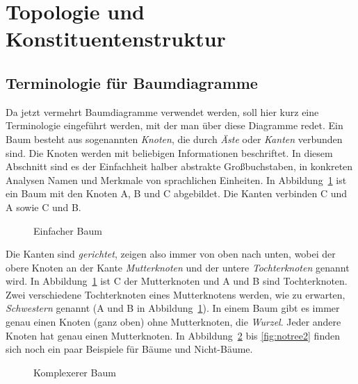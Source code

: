 \section{Topologie und Konstituentenstruktur}

\label{sec:topokons}

\subsection{Terminologie für Baumdiagramme}

\label{sec:baumterminologie}


Da jetzt vermehrt Baumdiagramme verwendet werden, soll hier kurz eine Terminologie eingeführt werden, mit der man über diese Diagramme redet.
Ein Baum besteht aus sogenannten \textit{Knoten}, die durch \textit{Äste} oder \textit{Kanten} verbunden sind.
Die Knoten werden mit beliebigen Informationen beschriftet.
In diesem Abschnitt sind es der Einfachheit halber abstrakte Großbuchstaben, in konkreten Analysen Namen und Merkmale von sprachlichen Einheiten.
In Abbildung~\ref{fig:baumschema} ist ein Baum mit den Knoten A, B und C abgebildet.
Die Kanten verbinden C und A sowie C und B.


\begin{figure}[!htbp]
  \centering
  \caption{Einfacher Baum}
  \label{fig:baumschema}
\end{figure}


Die Kanten sind \textit{gerichtet}, zeigen also immer von oben nach unten, wobei der obere Knoten an der Kante \textit{Mutterknoten} und der untere \textit{Tochterknoten} genannt wird.
In Abbildung~\ref{fig:baumschema} ist C der Mutterknoten und A und B sind Tochterknoten.
Zwei verschiedene Tochterknoten eines Mutterknotens werden, wie zu erwarten, \textit{Schwestern} genannt (\zB A und B in Abbildung~\ref{fig:baumschema}).
In einem Baum gibt es immer genau einen Knoten (ganz oben) ohne Mutterknoten, die \textit{Wurzel}.
Jeder andere Knoten hat genau einen Mutterknoten.
In Abbildung~\ref{fig:ctree} bis \ref{fig:notree2} finden sich noch ein paar Beispiele für Bäume und Nicht-Bäume.

\begin{figure}[!htbp]
  \centering
  \caption{Komplexerer Baum}
  \label{fig:ctree}
\end{figure}


